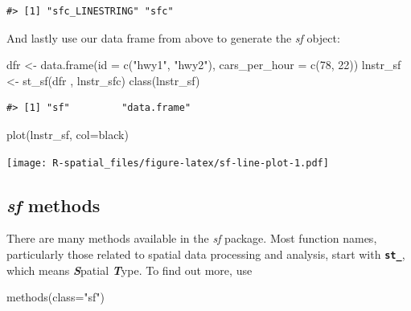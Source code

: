 \documentclass[
  11pt,
]{book}
\newenvironment{Shaded}{\begin{snugshade}}{\end{snugshade}}
\newcommand{\AttributeTok}[1]{\textcolor[rgb]{0.77,0.63,0.00}{#1}}
\newcommand{\DecValTok}[1]{\textcolor[rgb]{0.00,0.00,0.81}{#1}}
\newcommand{\FunctionTok}[1]{\textcolor[rgb]{0.00,0.00,0.00}{#1}}
\newcommand{\NormalTok}[1]{#1}
\newcommand{\OtherTok}[1]{\textcolor[rgb]{0.56,0.35,0.01}{#1}}
\newcommand{\StringTok}[1]{\textcolor[rgb]{0.31,0.60,0.02}{#1}}
\begin{document}
\begin{verbatim}
#> [1] "sfc_LINESTRING" "sfc"
\end{verbatim}

And lastly use our data frame from above to generate the \emph{sf} object:

\begin{Shaded}
\begin{Highlighting}[]
\NormalTok{dfr }\OtherTok{\textless{}{-}} \FunctionTok{data.frame}\NormalTok{(}\AttributeTok{id =} \FunctionTok{c}\NormalTok{(}\StringTok{"hwy1"}\NormalTok{, }\StringTok{"hwy2"}\NormalTok{), }\AttributeTok{cars\_per\_hour =} \FunctionTok{c}\NormalTok{(}\DecValTok{78}\NormalTok{, }\DecValTok{22}\NormalTok{)) }
\NormalTok{lnstr\_sf }\OtherTok{\textless{}{-}} \FunctionTok{st\_sf}\NormalTok{(dfr , lnstr\_sfc)}
\FunctionTok{class}\NormalTok{(lnstr\_sf)}
\end{Highlighting}
\end{Shaded}

\begin{verbatim}
#> [1] "sf"         "data.frame"
\end{verbatim}

\begin{Shaded}
\begin{Highlighting}[]
\FunctionTok{plot}\NormalTok{(lnstr\_sf, }\AttributeTok{col=}\StringTok{\textquotesingle{}black\textquotesingle{}}\NormalTok{)}
\end{Highlighting}
\end{Shaded}

\texttt{[image: R-spatial\_files/figure-latex/sf-line-plot-1.pdf]}

\hypertarget{sf-methods}{%
\subsection{\texorpdfstring{\emph{sf} methods}{sf methods}}\label{sf-methods}}

There are many methods available in the \emph{sf} package. Most function names, particularly those related to spatial data processing and analysis, start with \textbf{\texttt{st\_}}, which means \textbf{\emph{S}}patial \textbf{\emph{T}}ype. To find out more, use

\begin{Shaded}
\begin{Highlighting}[]
\FunctionTok{methods}\NormalTok{(}\AttributeTok{class=}\StringTok{"sf"}\NormalTok{)}
\end{Highlighting}
\end{Shaded}
\end{document}
